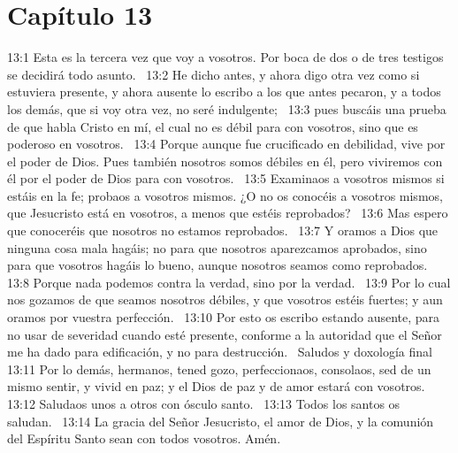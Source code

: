 \section*{Capítulo 13}

13:1 Esta es la tercera vez que voy a vosotros. Por boca de dos o de tres testigos se decidirá todo asunto.  
13:2 He dicho antes, y ahora digo otra vez como si estuviera presente, y ahora ausente lo escribo a los que antes pecaron, y a todos los demás, que si voy otra vez, no seré indulgente;  
13:3 pues buscáis una prueba de que habla Cristo en mí, el cual no es débil para con vosotros, sino que es poderoso en vosotros.  
13:4 Porque aunque fue crucificado en debilidad, vive por el poder de Dios. Pues también nosotros somos débiles en él, pero viviremos con él por el poder de Dios para con vosotros.  
13:5 Examinaos a vosotros mismos si estáis en la fe; probaos a vosotros mismos. ¿O no os conocéis a vosotros mismos, que Jesucristo está en vosotros, a menos que estéis reprobados?  
13:6 Mas espero que conoceréis que nosotros no estamos reprobados.  
13:7 Y oramos a Dios que ninguna cosa mala hagáis; no para que nosotros aparezcamos aprobados, sino para que vosotros hagáis lo bueno, aunque nosotros seamos como reprobados.  
13:8 Porque nada podemos contra la verdad, sino por la verdad.  
13:9 Por lo cual nos gozamos de que seamos nosotros débiles, y que vosotros estéis fuertes; y aun oramos por vuestra perfección.  
13:10 Por esto os escribo estando ausente, para no usar de severidad cuando esté presente, conforme a la autoridad que el Señor me ha dado para edificación, y no para destrucción.  
Saludos y doxología final  
13:11 Por lo demás, hermanos, tened gozo, perfeccionaos, consolaos, sed de un mismo sentir, y vivid en paz; y el Dios de paz y de amor estará con vosotros.  
13:12 Saludaos unos a otros con ósculo santo.  
13:13 Todos los santos os saludan.  
13:14 La gracia del Señor Jesucristo, el amor de Dios, y la comunión del Espíritu Santo sean con todos vosotros. Amén. 
